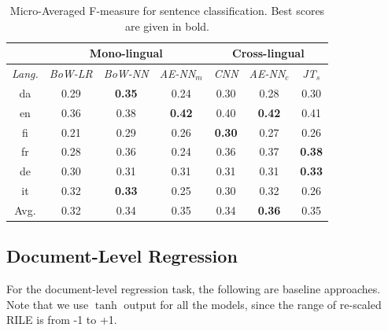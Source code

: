 \documentclass[11pt,a4paper]{article}
\begin{document}
 \begin{table}[!htp]
  \centering
  \begin{tabular}{ c@{\hskip 0.2in} c c c@{\hskip 0.25in} c c c}
  \toprule
   &  \multicolumn{3}{c}{Mono-lingual} & \multicolumn{3}{c}{Cross-lingual} \\
  \toprule
    \em{Lang.} & \em{BoW-LR} & \em{BoW-NN} & \em{AE-NN}$_{m}$ & \em{CNN} & \em{AE-NN}$_{c}$ & \em{JT}$_{s}$\\
    \midrule
    da  & 	0.29 & \textbf{0.35} & 0.24 & 0.30 & 0.28 & 0.30\\
    en   &  0.36 & 0.38 & \textbf{0.42} & 0.40 & \textbf{0.42} & 0.41\\    	
    fi  &   0.21 & 0.29 & 0.26 & \textbf{0.30} & 0.27 & 0.26\\
    fr    & 0.28 & 0.36 & 0.24 & 0.36 & 0.37 & \textbf{0.38} \\
    de    &  0.30 & 0.31 & 0.31 & 0.31 & 0.31 & \textbf{0.33}\\
    it    & 0.32 & \textbf{0.33} & 0.25 & 0.30 & 0.32 & 0.26\\
\midrule
Avg.    & 0.32 & 0.34 & 0.35 & 0.34 & \textbf{0.36} & 0.35\\

 \bottomrule

  \end{tabular}
  \caption{Micro-Averaged F-measure for sentence classification. Best scores are given in bold.}
  \label{tab:alx}
\end{table}

\subsection{Document-Level Regression}
For the document-level regression task, the following are baseline approaches. Note that we use $\tanh$ output for all the models, since the range of re-scaled RILE is from -1 to +1.
\end{document}
